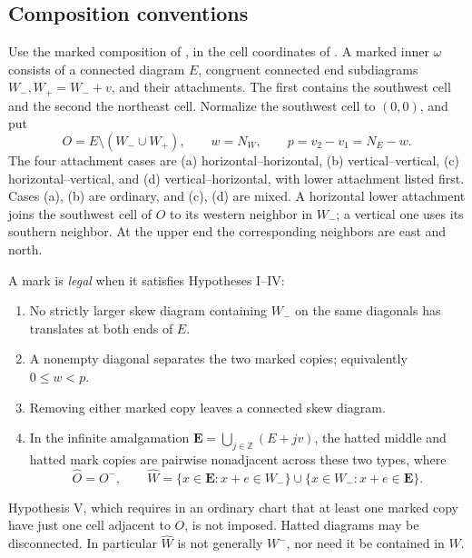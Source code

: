 \documentclass[11pt,a4paper]{amsart}
\numberwithin{equation}{section}
\theoremstyle{plain}
\theoremstyle{definition}
\begin{document}
\subsection{Composition conventions}

Use the marked composition of \cite[Def.~3.11]{McNamara2009Classification}, in the cell coordinates of \cite{Shields2026Gluing}.  A marked inner \(\omega\) consists of a connected diagram \(E\), congruent connected end subdiagrams \(W_-,W_+=W_-+v\), and their attachments.  The first contains the southwest cell and the second the northeast cell.  Normalize the southwest cell to \((0,0)\), and put
\begin{equation}\label{eq:mark-data}
 O=E\setminus(W_-\cup W_+),\qquad w=N_W,\qquad
 p=v_2-v_1=N_E-w.
\end{equation}
The four attachment cases are (a) horizontal--horizontal, (b) vertical--vertical, (c) horizontal--vertical, and (d) vertical--horizontal, with lower attachment listed first.  Cases (a), (b) are ordinary, and (c), (d) are mixed.  A horizontal lower attachment joins the southwest cell of \(O\) to its western neighbor in \(W_-\); a vertical one uses its southern neighbor.  At the upper end the corresponding neighbors are east and north.

A mark is \emph{legal} when it satisfies Hypotheses I--IV:
\begin{enumerate}
\item[(I)] No strictly larger skew diagram containing \(W_-\) on the same diagonals has translates at both ends of \(E\).
\item[(II)] A nonempty diagonal separates the two marked copies; equivalently \(0\le w<p\).
\item[(III)] Removing either marked copy leaves a connected skew diagram.
\item[(IV)] In the infinite amalgamation \(\boldsymbol E=\bigcup_{j\in\mathbb Z}(E+jv)\), the hatted middle and hatted mark copies are pairwise nonadjacent across these two types, where
\begin{equation}\label{eq:hatted-sets}
 \widehat O=O^-,\qquad
 \widehat W=\{x\in\boldsymbol E:x+e\in W_-\}
       \cup\{x\in W_-:x+e\in\boldsymbol E\}.
\end{equation}
\end{enumerate}
Hypothesis V, which requires in an ordinary chart that at least one marked copy have just one cell adjacent to \(O\), is not imposed.  Hatted diagrams may be disconnected.  In particular \(\widehat W\) is not generally \(W^-\), nor need it be contained in \(W\).
\end{document}
